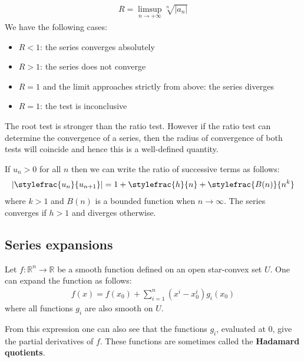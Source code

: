 	\begin{method}
		\begin{gather}
			R = \limsup_{n\rightarrow+\infty}\sqrt[n]{|a_n|}
		\end{gather}
	        We have the following cases:
	        \begin{itemize}
			\item $R < 1$: the series converges absolutely
		        \item $R > 1$: the series does not converge
		        \item $R = 1$ and the limit approaches strictly from above: the series diverges
		        \item $R = 1$: the test is inconclusive
		\end{itemize}
	\end{method}
	\begin{remark}
		The root test is stronger than the ratio test. However if the ratio test can determine the convergence of a series, then the radius of convergence of both tests will coincide and hence this is a well-defined quantity.
	\end{remark}

	\begin{method}
		If $u_n>0$ for all $n$ then we can write the ratio of successive terms as follows:
		\begin{gather}
			\label{series:gauss_test}
		        \left|\stylefrac{u_n}{u_{n+1}}\right| = 1 + \stylefrac{h}{n} + \stylefrac{B(n)}{n^k}
		\end{gather}
		where $k > 1$ and $B(n)$ is a bounded function when $n\rightarrow\infty$. The series converges if $h > 1$ and diverges otherwise.
    	\end{method}

\subsection{Series expansions}

	\begin{theorem}
		Let $f:\mathbb{R}^n\rightarrow\mathbb{R}$ be a smooth function defined on an open star-convex set $U$. One can expand the function as follows:
		\begin{gather}
			f(x) = f(x_0) + \sum_{i=1}^n(x^i-x^i_0)g_i(x_0)
		\end{gather}
		where all functions $g_i$ are also smooth on $U$.
	\end{theorem}
	From this expression one can also see that the functions $g_i$, evaluated at 0, give the partial derivatives of $f$. These functions are sometimes called the \textbf{Hadamard quotients}.
	

